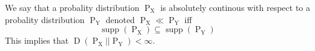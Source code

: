 We say that a probality distribution $\operatorname{P}_{\operatorname{X}}$ is absolutely continous with respect to a probality distribution $\operatorname{P}_{\operatorname{Y}}$ denoted $\operatorname{P}_{\operatorname{X}} \ll \operatorname{P}_{\operatorname{Y}}$ iff
$$\operatorname{supp}(\operatorname{P}_{\operatorname{X}}) \subseteq \operatorname{supp}(\operatorname{P}_{\operatorname{Y}})$$
This implies that $\operatorname{D}(\operatorname{P}_{\operatorname{X}} || \operatorname{P}_{\operatorname{Y}}) < \infty$.

